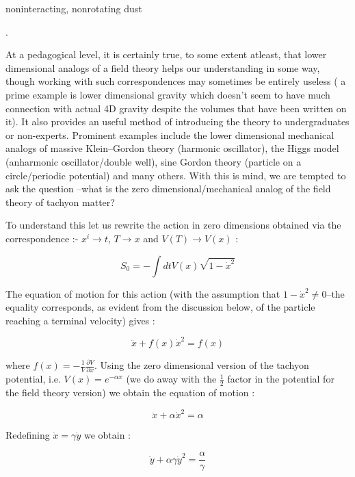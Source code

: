 \documentclass[a4paper,prd,aps,twocolumn]{revtex4}
\begin{document}
noninteracting, nonrotating dust {\cite{sen1}.

At a pedagogical level, it is certainly true, to some extent atleast,
that lower dimensional analogs
of a field theory helps our understanding in some way, though
working with such correspondences may sometimes be entirely useless
( a prime example is lower dimensional gravity which doesn't seem
to have much connection with actual 4D gravity despite the volumes that
have been written on it). 
It also provides an useful method of
introducing the theory to undergraduates or non-experts. Prominent
examples include the lower dimensional mechanical 
analogs of massive Klein--Gordon theory
(harmonic oscillator), the Higgs model (anharmonic oscillator/double well),
sine Gordon theory (particle on a circle/periodic potential) and many
others. With this is mind, we are tempted to ask the question --what
is the zero dimensional/mechanical 
analog of the field theory of tachyon matter?

To understand this let us rewrite the action in zero dimensions obtained 
via the correspondence :-  $x^{i} \rightarrow t$, $T\rightarrow x$ and 
$V(T)\rightarrow V(x)$ :

\begin{equation}
S_0 = -\int dt V(x) \sqrt{1-{\dot x}^2}
\end{equation}

The equation of motion for this action (with the assumption that $1-{\dot x}^2
\neq 0$--the equality corresponds, as evident from the discussion below, of
the particle reaching a terminal velocity) gives :

\begin{equation}
\ddot x + f(x){\dot x}^2 = f(x)
\end{equation}

where $f(x) = -\frac{1}{V}\frac{\partial V}{\partial x}$.
Using the zero dimensional version of the tachyon potential, i.e. 
$V(x) = e^{-\alpha x}$ (we do away with the $\frac{1}{2}$ factor in
the potential for the field theory version)
we obtain the equation of motion :

\begin{equation}
\ddot x +\alpha {\dot x}^2 = \alpha
\end{equation}

Redefining $\dot x = \gamma \dot y$ we obtain :

\begin{equation} 
\ddot y +\alpha \gamma {\dot y}^2 = \frac{\alpha}{\gamma}
\end{equation}

}
\end{document}
